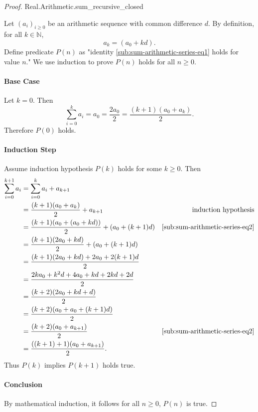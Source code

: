 \documentclass{article}
\begin{document}
\begin{proof}

    {Real.Arithmetic.sum\_recursive\_closed}

  Let $(a_i)_{i \geq 0}$ be an arithmetic sequence with common difference $d$.
  By definition, for all $k \in \mathbb{N}$,
    \begin{equation}
      \label{sub:sum-arithmetic-series-eq2}
      a_k = (a_0 + kd).
    \end{equation}
  Define predicate $P(n)$ as "identity \eqref{sub:sum-arithmetic-series-eq1}
    holds for value $n$."
  We use induction to prove $P(n)$ holds for all $n \geq 0$.

  \paragraph{Base Case}%

    Let $k = 0$.
    Then $$\sum_{i=0}^k a_i = a_0 = \frac{2a_0}{2} =
      \frac{(k + 1)(a_0 + a_k)}{2}.$$
    Therefore $P(0)$ holds.

  \paragraph{Induction Step}%

    Assume induction hypothesis $P(k)$ holds for some $k \geq 0$.
    Then
      \begin{align*}
        \sum_{i=0}^{k+1} a_i
          & = \sum_{i=0}^k a_i + a_{k+1} \\
          & = \frac{(k + 1)(a_0 + a_k)}{2} + a_{k+1}
            & \text{induction hypothesis} \\
          & = \frac{(k + 1)(a_0 + (a_0 + kd))}{2} + (a_0 + (k + 1)d)
            & \eqref{sub:sum-arithmetic-series-eq2} \\
          & = \frac{(k + 1)(2a_0 + kd)}{2} + (a_0 + (k + 1)d) \\
          & = \frac{(k + 1)(2a_0 + kd) + 2a_0 + 2(k + 1)d}{2} \\
          & = \frac{2ka_0 + k^2d + 4a_0 + kd + 2kd + 2d}{2} \\
          & = \frac{(k + 2)(2a_0 + kd + d)}{2} \\
          & = \frac{(k + 2)(a_0 + a_0 + (k + 1)d)}{2} \\
          & = \frac{(k + 2)(a_0 + a_{k+1})}{2}
            & \eqref{sub:sum-arithmetic-series-eq2} \\
          & = \frac{((k + 1) + 1)(a_0 + a_{k+1})}{2}.
      \end{align*}
    Thus $P(k)$ implies $P(k + 1)$ holds true.

  \paragraph{Conclusion}%

    By mathematical induction, it follows for all $n \geq 0$, $P(n)$ is true.

\end{proof}
\end{document}
